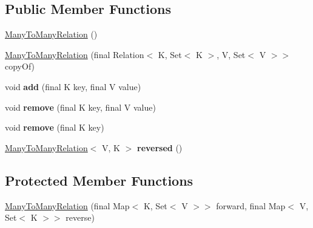 \subsection*{Public Member Functions}
\begin{DoxyCompactItemize}
\item 
\hyperlink{classosd_1_1util_1_1relation_1_1_many_to_many_relation_3_01_k_00_01_v_01_4_a6e2952d72db443443845d52b1a6e4b5b}{Many\-To\-Many\-Relation} ()
\item 
\hyperlink{classosd_1_1util_1_1relation_1_1_many_to_many_relation_3_01_k_00_01_v_01_4_a16dc7bf49e896e39d9f8380ddc3f80b6}{Many\-To\-Many\-Relation} (final Relation$<$ K, Set$<$ K $>$, V, Set$<$ V $>$$>$ copy\-Of)
\item 
\hypertarget{classosd_1_1util_1_1relation_1_1_many_to_many_relation_3_01_k_00_01_v_01_4_a097c72570ffc4b114cccd4124879398f}{void {\bfseries add} (final K key, final V value)}\label{classosd_1_1util_1_1relation_1_1_many_to_many_relation_3_01_k_00_01_v_01_4_a097c72570ffc4b114cccd4124879398f}

\item 
\hypertarget{classosd_1_1util_1_1relation_1_1_many_to_many_relation_3_01_k_00_01_v_01_4_a0eea8c6a44dc7ed9d119b47c173c9d75}{void {\bfseries remove} (final K key, final V value)}\label{classosd_1_1util_1_1relation_1_1_many_to_many_relation_3_01_k_00_01_v_01_4_a0eea8c6a44dc7ed9d119b47c173c9d75}

\item 
\hypertarget{classosd_1_1util_1_1relation_1_1_many_to_many_relation_3_01_k_00_01_v_01_4_ae5eb9dd6957255b13048122b17466001}{void {\bfseries remove} (final K key)}\label{classosd_1_1util_1_1relation_1_1_many_to_many_relation_3_01_k_00_01_v_01_4_ae5eb9dd6957255b13048122b17466001}

\item 
\hypertarget{classosd_1_1util_1_1relation_1_1_many_to_many_relation_3_01_k_00_01_v_01_4_a1bd698b9d8e715e18e243dd8557d4fc1}{\hyperlink{classosd_1_1util_1_1relation_1_1_many_to_many_relation_3_01_k_00_01_v_01_4_a6e2952d72db443443845d52b1a6e4b5b}{Many\-To\-Many\-Relation}$<$ V, K $>$ {\bfseries reversed} ()}\label{classosd_1_1util_1_1relation_1_1_many_to_many_relation_3_01_k_00_01_v_01_4_a1bd698b9d8e715e18e243dd8557d4fc1}

\end{DoxyCompactItemize}
\subsection*{Protected Member Functions}
\begin{DoxyCompactItemize}
\item 
\hyperlink{classosd_1_1util_1_1relation_1_1_many_to_many_relation_3_01_k_00_01_v_01_4_abdf2b187c2f80f266bb0fc5ef2ce43c3}{Many\-To\-Many\-Relation} (final Map$<$ K, Set$<$ V $>$$>$ forward, final Map$<$ V, Set$<$ K $>$$>$ reverse)
\end{DoxyCompactItemize}


